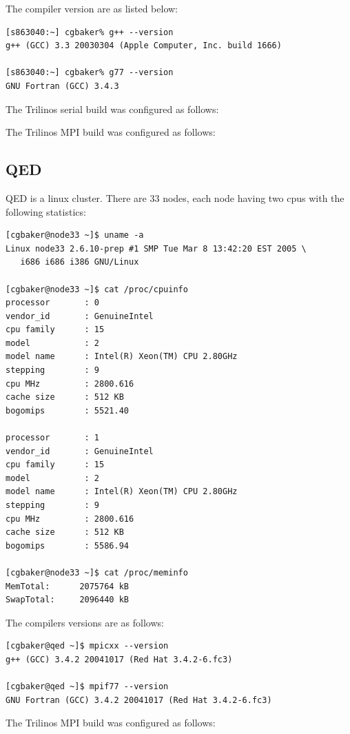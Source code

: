 \documentclass[10pt]{article}
\begin{document}
The compiler version are as listed below:
\begin{verbatim}
[s863040:~] cgbaker% g++ --version
g++ (GCC) 3.3 20030304 (Apple Computer, Inc. build 1666)

[s863040:~] cgbaker% g77 --version
GNU Fortran (GCC) 3.4.3
\end{verbatim}

The Trilinos serial build was configured as follows:


The Trilinos MPI build was configured as follows:


\subsection{QED}

QED is a linux cluster. There are 33 nodes, each node having two cpus with the following
statistics:
\begin{verbatim}
[cgbaker@node33 ~]$ uname -a
Linux node33 2.6.10-prep #1 SMP Tue Mar 8 13:42:20 EST 2005 \
   i686 i686 i386 GNU/Linux

[cgbaker@node33 ~]$ cat /proc/cpuinfo 
processor       : 0
vendor_id       : GenuineIntel
cpu family      : 15
model           : 2
model name      : Intel(R) Xeon(TM) CPU 2.80GHz
stepping        : 9
cpu MHz         : 2800.616
cache size      : 512 KB
bogomips        : 5521.40

processor       : 1
vendor_id       : GenuineIntel
cpu family      : 15
model           : 2
model name      : Intel(R) Xeon(TM) CPU 2.80GHz
stepping        : 9
cpu MHz         : 2800.616
cache size      : 512 KB
bogomips        : 5586.94

[cgbaker@node33 ~]$ cat /proc/meminfo 
MemTotal:      2075764 kB
SwapTotal:     2096440 kB
\end{verbatim}

The compilers versions are as follows:
\begin{verbatim}
[cgbaker@qed ~]$ mpicxx --version
g++ (GCC) 3.4.2 20041017 (Red Hat 3.4.2-6.fc3)

[cgbaker@qed ~]$ mpif77 --version
GNU Fortran (GCC) 3.4.2 20041017 (Red Hat 3.4.2-6.fc3)
\end{verbatim}

The Trilinos MPI build was configured as follows:

\end{document}
